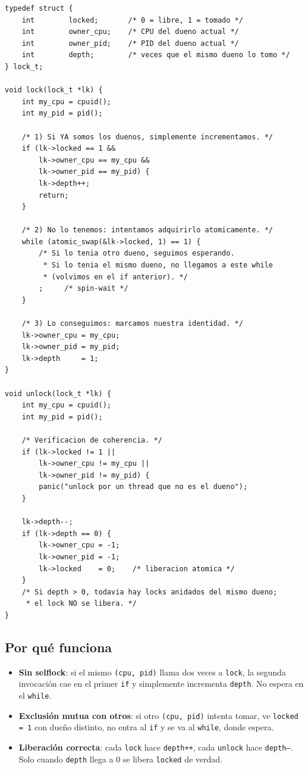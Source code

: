\documentclass[11pt,a4paper]{article}
\begin{document}
\begin{lstlisting}[style=cstyle]
typedef struct {
    int        locked;       /* 0 = libre, 1 = tomado */
    int        owner_cpu;    /* CPU del dueno actual */
    int        owner_pid;    /* PID del dueno actual */
    int        depth;        /* veces que el mismo dueno lo tomo */
} lock_t;

void lock(lock_t *lk) {
    int my_cpu = cpuid();
    int my_pid = pid();

    /* 1) Si YA somos los duenos, simplemente incrementamos. */
    if (lk->locked == 1 &&
        lk->owner_cpu == my_cpu &&
        lk->owner_pid == my_pid) {
        lk->depth++;
        return;
    }

    /* 2) No lo tenemos: intentamos adquirirlo atomicamente. */
    while (atomic_swap(&lk->locked, 1) == 1) {
        /* Si lo tenia otro dueno, seguimos esperando.
         * Si lo tenia el mismo dueno, no llegamos a este while
         * (volvimos en el if anterior). */
        ;     /* spin-wait */
    }

    /* 3) Lo conseguimos: marcamos nuestra identidad. */
    lk->owner_cpu = my_cpu;
    lk->owner_pid = my_pid;
    lk->depth     = 1;
}

void unlock(lock_t *lk) {
    int my_cpu = cpuid();
    int my_pid = pid();

    /* Verificacion de coherencia. */
    if (lk->locked != 1 ||
        lk->owner_cpu != my_cpu ||
        lk->owner_pid != my_pid) {
        panic("unlock por un thread que no es el dueno");
    }

    lk->depth--;
    if (lk->depth == 0) {
        lk->owner_cpu = -1;
        lk->owner_pid = -1;
        lk->locked    = 0;    /* liberacion atomica */
    }
    /* Si depth > 0, todavia hay locks anidados del mismo dueno;
     * el lock NO se libera. */
}
\end{lstlisting}

\subsection*{Por qué funciona}

\begin{itemize}[leftmargin=*]
    \item \textbf{Sin selflock}: si el mismo \texttt{(cpu, pid)}
        llama dos veces a \texttt{lock}, la segunda invocación cae
        en el primer \texttt{if} y simplemente incrementa
        \texttt{depth}. No espera en el \texttt{while}.
    \item \textbf{Exclusión mutua con otros}: si otro
        \texttt{(cpu, pid)} intenta tomar, ve \texttt{locked = 1}
        con dueño distinto, no entra al \texttt{if} y se va al
        \texttt{while}, donde espera.
    \item \textbf{Liberación correcta}: cada \texttt{lock} hace
        \texttt{depth++}, cada \texttt{unlock} hace
        \texttt{depth--}. Solo cuando \texttt{depth} llega a $0$ se
        libera \texttt{locked} de verdad.
\end{itemize}
\end{document}
